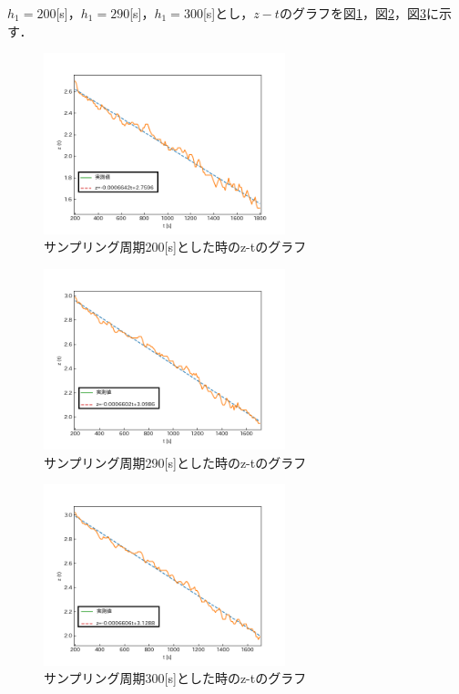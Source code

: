 \documentclass[12pt]{jsarticle}
\begin{document}
$h_1=200$[s]，$h_1=290$[s]，$h_1=300$[s]とし，$z-t$のグラフを図\ref{z-t_h1=200s}，図\ref{z-t_h1=290s}，図\ref{z-t_h1=300s}に示す．
\begin{figure}[tb]
  \begin{center}
    \includegraphics[clip,width=7.0cm]{../graph/z-t200s.png}
    \caption{サンプリング周期200[s]とした時のz-tのグラフ}
    \label{z-t_h1=200s}
  \end{center}
\end{figure}
\begin{figure}[tb]
  \begin{center}
    \includegraphics[clip,width=7.0cm]{../graph/z-t290s.png}
    \caption{サンプリング周期290[s]とした時のz-tのグラフ}
    \label{z-t_h1=290s}
  \end{center}
\end{figure}
\begin{figure}[tb]
  \begin{center}
    \includegraphics[clip,width=7.0cm]{../graph/z-t300s.png}
    \caption{サンプリング周期300[s]とした時のz-tのグラフ}
    \label{z-t_h1=300s}
  \end{center}
\end{figure}
\end{document}
